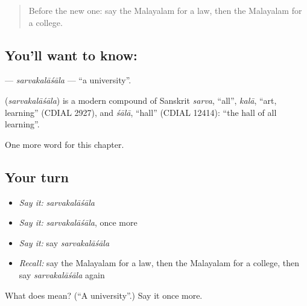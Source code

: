 \label{lesson:ML-C299-sarvakalasala}



\begin{quote}
Before the new one: say the Malayalam for a law, then the Malayalam for a college.
\end{quote}

\subsection*{You'll want to know: }
\textbf{} — \emph{sarvakalāśāla} — \textquotedblleft{}a university\textquotedblright{}.

\begin{cousinweb}
\textbf{} (\emph{sarvakalāśāla}) is a modern compound of Sanskrit \emph{sarva}, \textquotedblleft{}all\textquotedblright{}, \emph{kalā}, \textquotedblleft{}art, learning\textquotedblright{} (CDIAL 2927), and \emph{śālā}, \textquotedblleft{}hall\textquotedblright{} (CDIAL 12414): \textquotedblleft{}the hall of all learning\textquotedblright{}.
\end{cousinweb}

\begin{grammarlens}[title={What you've built}]
One more word for this chapter.
\end{grammarlens}

\subsection*{Your turn}
\begin{itemize}
\raggedright
  \item \emph{Say it:} \emph{sarvakalāśāla}
  \item \emph{Say it:} \emph{sarvakalāśāla}, once more
  \item \emph{Say it:} say \emph{sarvakalāśāla}
  \item \emph{Recall:} say the Malayalam for a law, then the Malayalam for a college, then say \emph{sarvakalāśāla} again
\end{itemize}

\begin{tcolorbox}[breakable,colback=teal!4,colframe=teal!35!black,title={Before you move on}]
What does  mean? (\textquotedblleft{}A university\textquotedblright{}.) Say it once more.
\end{tcolorbox}
